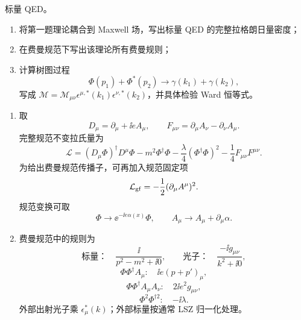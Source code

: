 \begin{question}[40 分]
标量 QED。
\begin{enumerate}
  \item 将第一题理论耦合到 Maxwell 场，写出标量 QED 的完整拉格朗日量密度；
  \item 在费曼规范下写出该理论所有费曼规则；
  \item 计算树图过程
  \[
  \Phi(p_1)+\Phi^*(p_2)\to\gamma(k_1)+\gamma(k_2),
  \]
  写成 $\mathcal M=\mathcal M_{\mu\nu}\epsilon^{\mu,*}(k_1)\epsilon^{\nu,*}(k_2)$，并具体检验 Ward 恒等式。
\end{enumerate}
\begin{solution}
\begin{enumerate}
  \item 取
  \[
  D_\mu=\partial_\mu+\ii eA_\mu,
  \qquad
  F_{\mu\nu}=\partial_\mu A_\nu-\partial_\nu A_\mu.
  \]
  完整规范不变拉氏量为
  \[
  \boxed{
  \mathcal L=(D_\mu\Phi)^\dagger D^\mu\Phi
  -m^2\Phi^\dagger\Phi
  -\frac\lambda4(\Phi^\dagger\Phi)^2
  -\frac14F_{\mu\nu}F^{\mu\nu}}.
  \]
  为给出费曼规范传播子，可再加入规范固定项
  \[
  \mathcal L_{\rm gf}=-\frac12(\partial_\mu A^\mu)^2.
  \]
  规范变换可取
  \[
  \Phi\to\ee^{-\ii e\alpha(x)}\Phi,
  \qquad A_\mu\to A_\mu+\partial_\mu\alpha.
  \]

  \item 费曼规范中的规则为
  \[
  \text{标量：}\quad \frac{\ii}{p^2-m^2+\ii0},
  \qquad
  \text{光子：}\quad \frac{-\ii g_{\mu\nu}}{k^2+\ii0},
  \]
  \[
  \Phi\Phi^\dagger A_\mu:\quad \boxed{\ii e(p+p')_\mu},
  \]
  \[
  \Phi\Phi^\dagger A_\mu A_\nu:\quad \boxed{2\ii e^2g_{\mu\nu}},
  \]
  \[
  \Phi^2\Phi^{\dagger2}:\quad \boxed{-\ii\lambda}.
  \]
  外部出射光子乘 $\epsilon_\mu^*(k)$；外部标量按通常 LSZ 归一化处理。


\end{enumerate}
\end{solution}
\end{question}

